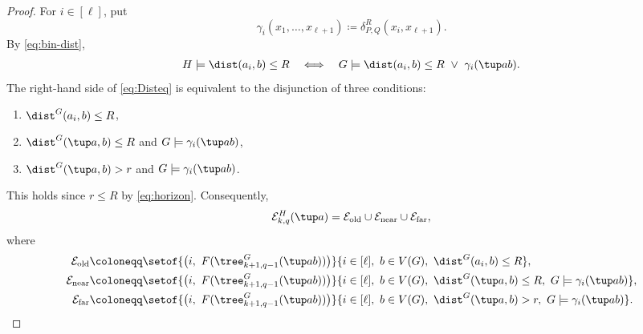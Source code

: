 \begin{proof}
For $i\in[\ell]$, put
\[
\gamma_i(x_1,\ldots,x_{\ell+1})\coloneqq\delta^R_{P,Q}(x_i,x_{\ell+1}).
\]
By \eqref{eq:bin-dist},
\begin{align}\label{eq:Disteq}
H\models\dist(a_i,b)\le R
\quad\Longleftrightarrow\quad
G\models\dist(a_i,b)\le R\ \lor\ \gamma_i(\tup a b).
   \end{align}
The right-hand side of \eqref{eq:Disteq}
is equivalent to the disjunction of three conditions:
\begin{enumerate}
   \item  $\dist^G(a_i,b)\le R$,
   \item  $\dist^G(\tup a,b)\le R$ and $G\models\gamma_i(\tup a b)$,
    \item  $\dist^G(\tup a,b)>r $ and $G\models\gamma_i(\tup a b)$.
\end{enumerate}
This holds since $r\le R$ by \eqref{eq:horizon}.
Consequently,
\[
\mathcal E^{H}_{k,q}(\tup a)=\mathcal E_{\mathrm{old}}\cup\mathcal E_{\mathrm{near}}\cup\mathcal E_{\mathrm{far}},
\]
where
\begin{align*}
\mathcal E_{\mathrm{old}}&\coloneqq\setof{\bigl(i,\ F(\tree^{G}_{k+1,q-1}(\tup a b))\bigr)}{i\in[\ell],\ b\in V(G),\ \dist^G(a_i,b)\le R},\\
\mathcal E_{\mathrm{near}}&\coloneqq\setof{\bigl(i,\ F(\tree^{G}_{k+1,q-1}(\tup a b))\bigr)}{i\in[\ell],\ b\in V(G),\ \dist^G(\tup a,b)\le R,\ G\models\gamma_i(\tup a b)},\\
\mathcal E_{\mathrm{far}}&\coloneqq\setof{\bigl(i,\ F(\tree^{G}_{k+1,q-1}(\tup a b))\bigr)}{i\in[\ell],\ b\in V(G),\ \dist^G(\tup a,b)>r,\ G\models\gamma_i(\tup a b)}.
\end{align*}


\end{proof}
